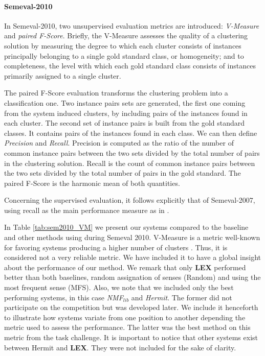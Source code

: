 

\paragraph{Semeval-2010}
In Semeval-2010, two unsupervised evaluation metrics are introduced: \textit{V-Measure} and \textit{paired F-Score}. Briefly, the V-Measure assesses the quality of a clustering solution by measuring the degree to which each cluster consists of instances principally belonging to a single gold standard class, or homogeneity; and to completeness, the level with which each gold standard class consists of instances primarily assigned to a single cluster.

The paired F-Score evaluation transforms the clustering problem into a classification one. Two instance pairs sets are generated, the first one coming from the system induced clusters, by including pairs of the instances found in each cluster. The second set of instance pairs is built from the gold standard classes. It contains pairs of the instances found in each class. We can then define \textit{Precision} and \textit{Recall}. Precision is computed as the ratio of the number of common instance pairs between the two sets divided by the total number of pairs in the clustering solution. Recall is the count of common instance pairs between the two sets divided by the total number of pairs in the gold standard. The paired F-Score is the harmonic mean of both quantities.

Concerning the supervised evaluation, it follows explicitly that of Semeval-2007, using recall as the main performance measure as in  \cite{Semeval2010,VandeCruys2011,pedersen2010duluth}.


In Table \ref{tab:sem2010_VM} we present our systems compared to the baseline and other methods using during Semeval 2010. V-Measure is a metric well-known for favoring systems producing a higher number of clusters \cite{VandeCruys2011,pedersen2010duluth}. Thus, it is considered not a very reliable metric. We have included it to have a global insight about the performance of our method. We remark that only \textbf{LEX} performed better than both baselines, random assignation of senses (Random) and using the most frequent sense (MFS). Also, we note that we included only the best performing systems, in this case \textit{NMF$_{lib}$} and  \textit{Hermit}. The former  did not participate on the competition but was developed later. We include it henceforth to illustrate how systems variate from one position to another depending the metric used to assess the performance. The latter was the best method on this metric from the task challenge. It is important to notice that other systems exist between Hermit and \textbf{LEX}. They were not included for the sake of clarity.

